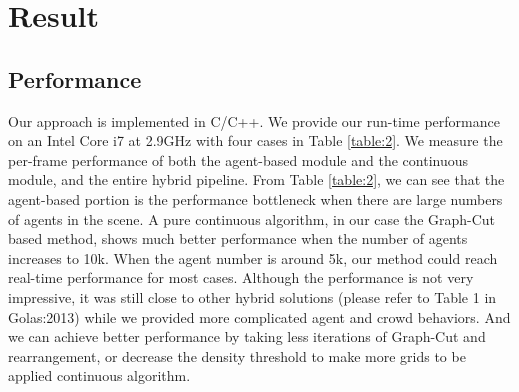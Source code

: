 \documentclass[conference]{acmsiggraph}
\begin{document}
\section{Result}
\label{section:6}
\subsection{Performance}
\label{section:6.1}
Our approach is implemented in C/C++. We provide our run-time performance on an Intel Core i7 at 2.9GHz with four cases in Table \ref{table:2}. We measure the per-frame performance of both the agent-based module and the continuous module, and the entire hybrid pipeline. From Table \ref{table:2}, we can see that the agent-based portion is the performance bottleneck when there are large numbers of agents in the scene. A pure continuous algorithm, in our case the Graph-Cut based method, shows much better performance when the number of agents increases to 10k. When the agent number is around 5k, our method could reach real-time performance for most cases. Although the performance is not very impressive, it was still close to other hybrid solutions (please refer to Table 1 in {Golas:2013}) while we provided more complicated agent and crowd behaviors. And we can achieve better performance by taking less iterations of Graph-Cut and rearrangement, or decrease the density threshold to make more grids to be applied continuous algorithm.
\end{document}
